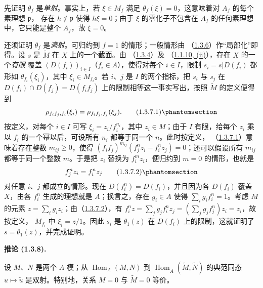 \documentclass[UTF8,fontset=none,11pt,oneside,openany]{ctexbook}
\newenvironment{corollary}[1][]{%
  \par\medskip\noindent\textbf{推论 (#1).}\ %
}{\par}
\newcommand{\oldpage}[2][]{%
  \hypertarget{ega-source-page-#1-#2}{}%
  \marginnote{\scriptsize\textbf{#1}~|~#2}\ignorespaces}
\let\EGAOriginalLabel\label
\renewcommand{\label}[1]{\phantomsection\EGAOriginalLabel{#1}}
\begin{document}
先证明 $\theta_f$ 是\emph{单射}。事实上，若 $\xi\in M_f$ 满足
$\theta_f(\xi)=0$，这意味着对 $A_f$ 的每个素理想 $\mathfrak{p}$，
存在 $h\notin\mathfrak{p}$ 使得 $h\xi=0$；由于 $\xi$ 的零化子不包含在
$A_f$ 的任何素理想中，它只能是整个 $A_f$，故 $\xi=0$。

还须证明 $\theta_f$ 是\emph{满射}。可归约到 $f=1$ 的情形；一般情形由
（\hyperref[I.1.3.6-fr]{1.3.6}）作“局部化”即得。设 $s$ 是
$\widetilde{M}$ 在 $X$ 上的一个截面。由
（\hyperref[I.1.3.4-fr]{1.3.4}）及
（\hyperref[I.1.1.10-fr]{1.1.10, (ii)}），存在 $X$ 的一个\emph{有限}
覆盖 $(D(f_i))_{i\in I}$（$f_i\in A$），使得对每个 $i\in I$，限制
$s_i=s|D(f_i)$ 都形如 $\theta_{f_i}(\xi_i)$，其中
$\xi_i\in M_{f_i}$。若 $i$、$j$ 是 $I$ 的两个指标，把 $s_i$ 与 $s_j$
在 $D(f_i)\cap D(f_j)=D(f_i f_j)$ 上的限制相等这一事实写出，按照
$\widetilde{M}$ 的定义便得到
\begin{equation}
  \rho_{f_i f_j,f_i}(\xi_i)=\rho_{f_i f_j,f_j}(\xi_j).
  \tag{1.3.7.1}\label{I.1.3.7.1-fr}
\end{equation}
按定义，对每个 $i\in I$ 可写
$\xi_i=z_i/f_i^{n_i}$，其中 $z_i\in M$；由于 $I$ 有限，给每个 $z_i$
乘以 $f_i$ 的一个幂以后，可设所有 $n_i$ 都等于同一个 $n$。此时按定义，
（\hyperref[I.1.3.7.1-fr]{1.3.7.1}）意味着存在整数
$m_{ij}\geq0$，使得
$(f_i f_j)^{m_{ij}}(f_j^n z_i-f_i^n z_j)=0$；还可以假设所有
$m_{ij}$ 都等于同一个整数 $m$。于是把 $z_i$ 替换为 $f_i^m z_i$，便归约到
$m=0$ 的情形，也就是
\begin{equation}
  f_j^n z_i=f_i^n z_j
  \tag{1.3.7.2}\label{I.1.3.7.2-fr}
\end{equation}
对任意 $i$、$j$ 都成立的情形。现在 $D(f_i^n)=D(f_i)$，并且因为各
$D(f_i)$ 覆盖 $X$，由各 $f_i^n$ 生成的理想就是 $A$；换言之，存在
$g_i\in A$ 使得 $\sum_i g_i f_i^n=1$。考虑 $M$ 的元素
$z=\sum_i g_i z_i$；由（\hyperref[I.1.3.7.2-fr]{1.3.7.2}），有
$f_i^n z=\sum_j g_j f_i^n z_j=(\sum_j g_j f_j^n)z_i=z_i$，故按定义，
$M_{f_i}$ 中 $\xi_i=z/1$。因此
\oldpage[I]{87}
$s_i$ 是 $\theta_1(z)$ 在 $D(f_i)$ 上的限制，这就证明了
$s=\theta_1(z)$，并完成证明。

\begin{corollary}[1.3.8]
\label{I.1.3.8-fr}
设 $M$、$N$ 是两个 $A$-模；从 $\operatorname{Hom}_A(M,N)$ 到
$\operatorname{Hom}_{\widetilde{A}}(\widetilde{M},\widetilde{N})$ 的典范同态
$u\mapsto\widetilde{u}$ 是双射。特别地，关系 $M=0$ 与
$\widetilde{M}=0$ 等价。
\end{corollary}
\end{document}
